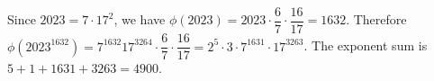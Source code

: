 Since $2023=7\cdot17^2$, we have $\phi(2023)=2023\cdot\dfrac{6}{7}\cdot\dfrac{16}{17}=1632$. Therefore $\phi(2023^{1632})=7^{1632}17^{3264}\cdot\dfrac{6}{7}\cdot\dfrac{16}{17}=2^5\cdot3\cdot7^{1631}\cdot17^{3263}$. The exponent sum is $5+1+1631+3263=\boxed{4900}$.
